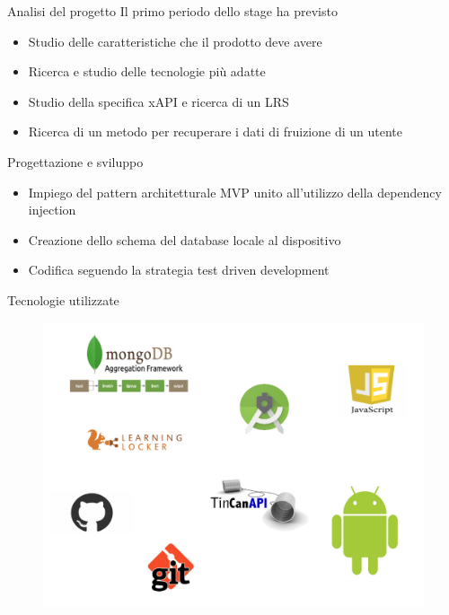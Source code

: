 \documentclass[aspectratio=43]{beamer}
\begin{document}
	\begin{frame}{Analisi del progetto}
		Il primo periodo dello stage ha previsto
		\begin{itemize}
			\item Studio delle caratteristiche che il prodotto deve avere
			\item Ricerca e studio delle tecnologie più adatte
			\item Studio della specifica xAPI e ricerca di un LRS
			\item Ricerca di un metodo per recuperare i dati di fruizione di un utente
		\end{itemize}
	\end{frame}

	\begin{frame}{Progettazione e sviluppo}
		\begin{itemize}
			\item Impiego del pattern architetturale MVP unito all'utilizzo della dependency injection
			\item Creazione dello schema del database locale al dispositivo
			\item Codifica seguendo la strategia test driven development
		\end{itemize}
	\end{frame}

	\begin{frame}{Tecnologie utilizzate}
		\begin{figure}[H]
			\centering
			\includegraphics[scale=0.35]{images/tecnologie}
		\end{figure}
	\end{frame}
\end{document}
